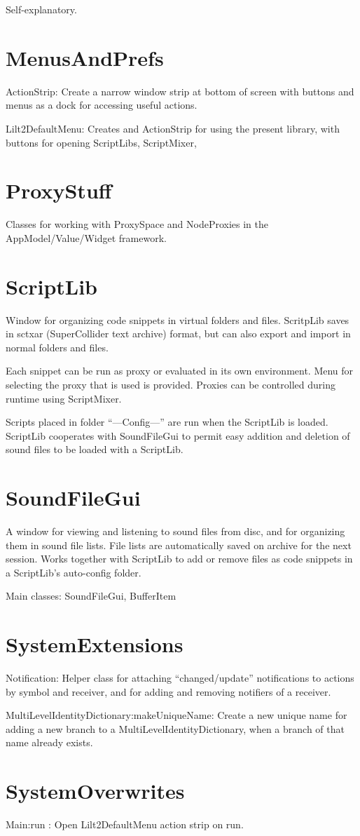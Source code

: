 \documentclass[11pt, a4paper]{scrartcl}
\begin{document}
Self-explanatory. 
\section{MenusAndPrefs}
\label{sec-5}


ActionStrip: Create a narrow window strip at bottom of screen with buttons and menus as a dock for accessing useful actions. 

Lilt2DefaultMenu: Creates and ActionStrip for using the present library, with buttons for opening ScriptLibs, ScriptMixer, 
\section{ProxyStuff}
\label{sec-6}


Classes for working with ProxySpace and NodeProxies in the AppModel/Value/Widget framework.
\section{ScriptLib}
\label{sec-7}


Window for organizing code snippets in virtual folders and files. ScritpLib saves in sctxar (SuperCollider text archive) format, but can also export and import in normal folders and files. 

Each snippet can be run as proxy or evaluated in its own environment. Menu for selecting the proxy that is used is provided. Proxies can be controlled during runtime using ScriptMixer. 

Scripts placed in folder ``---Config---'' are run when the ScriptLib is loaded.  ScriptLib cooperates with SoundFileGui to permit easy addition and deletion of sound files to be loaded with a ScriptLib. 
\section{SoundFileGui}
\label{sec-8}


A window for viewing and listening to sound files from disc, and for organizing them in sound file lists. File lists are automatically saved on archive for the next session. Works together with ScriptLib to add or remove files as code snippets in a ScriptLib's auto-config folder. 

Main classes: SoundFileGui, BufferItem
\section{SystemExtensions}
\label{sec-9}


Notification: Helper class for attaching ``changed/update'' notifications to actions by symbol and receiver, and for adding and removing notifiers of a receiver. 

MultiLevelIdentityDictionary:makeUniqueName: Create a new unique name for adding a new branch to a MultiLevelIdentityDictionary, when a branch of that name already exists. 
\section{SystemOverwrites}
\label{sec-10}


Main:run : Open Lilt2DefaultMenu action strip on run. 
\end{document}
